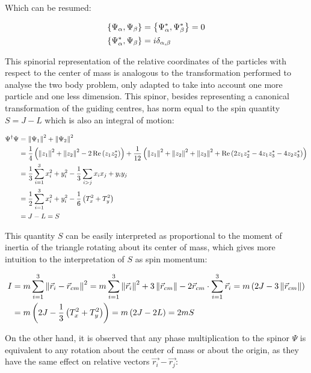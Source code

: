 Which can be resumed:

\begin{align}
\left\lbrace \Psi_\alpha, \Psi_\beta \right\rbrace &= \left\lbrace \Psi_\alpha^*, \Psi_\beta^* \right\rbrace = 0\\
\left\lbrace \Psi_\alpha^*, \Psi_\beta \right\rbrace &= i\delta_{\alpha,\beta}
\label{eq:canonicalSpinor}
\end{align}

This spinorial representation of the relative coordinates of the particles with respect to the center of mass is analogous to the transformation performed to analyse the two body problem, only adapted to take into account one more particle and one less dimension. This spinor, besides representing a canonical transformation of the guiding centres, has norm equal to the spin quantity $S = J-L$ which is also an integral of motion:

\small
\begin{align*}
\Psi^\dagger\Psi &= \left\lVert \Psi_1 \right\rVert^2 + \left\lVert \Psi_2 \right\rVert^2 \\
&= \frac{1}{4}\left( \left\lVert z_1 \right\rVert^2 + \left\lVert z_2 \right\rVert^2 - 2\operatorname{Re}\left( z_1z_2^* \right) \right) + \frac{1}{12}\left( \left\lVert z_1 \right\rVert^2 + \left\lVert z_2 \right\rVert^2+ \left\lVert z_3 \right\rVert^2 + \operatorname{Re}\left( 2z_1z_2^*- 4z_1z_3^*- 4z_2z_3^* \right) \right)\\
&= \frac{1}{3}\sum_{i=1}^3 x_i^2 + y_i^2 -\frac{1}{3}\sum_{i > j} x_ix_j + y_iy_j\\
&= \frac{1}{2}\sum_{i=1}^3 x_i^2 + y_i^2 - \frac{1}{6}\left( T_x^2+T_y^2 \right)\\
&= J-L = S
\end{align*}
\normalsize

This quantity $S$ can be easily interpreted as proportional to the moment of inertia of the triangle rotating about its center of mass, which gives more intuition to the interpretation of $S$ as spin momentum:

\begin{align*}
I &= m\sum_{i=1}^3 \left\lVert \vec{r}_i - \vec{r}_{cm} \right\rVert^2 = m\sum_{i=1}^3 \left\lVert \vec{r}_i \right\rVert^2 + 3\left\lVert \vec{r}_{cm} \right\rVert - 2\vec{r}_{cm}\cdot\sum_{i=1}^3\vec{r}_i =m\left( 2J -3\left\lVert \vec{r}_{cm} \right\rVert \right)\\
&= m\left( 2J - \frac{1}{3}\left( T_x^2+T_y^2 \right) \right) = m\left( 2J-2L \right) = 2mS
\end{align*}

On the other hand, it is observed that any phase multiplication to the spinor $\Psi$ is equivalent to any rotation about the center of mass or about the origin, as they have the same effect on relative vectors $\vec{r_i}-\vec{r_j}$:

